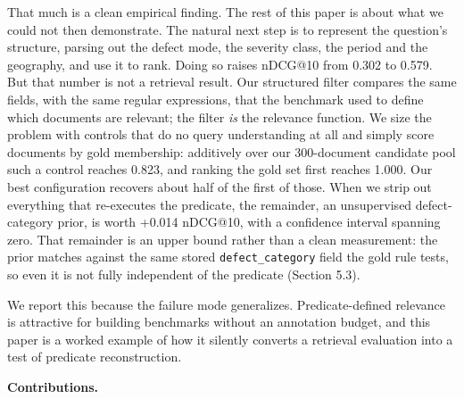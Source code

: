 \documentclass[acmsmall]{acmart}
\begin{document}
That much is a clean empirical finding. The rest of this paper is about what we could not then demonstrate. The natural next step is to represent the question's structure, parsing out the defect mode, the severity class, the period and the geography, and use it to rank. Doing so raises nDCG@10 from 0.302 to 0.579. But that number is not a retrieval result. Our structured filter compares the same fields, with the same regular expressions, that the benchmark used to define which documents are relevant; the filter \textit{is} the relevance function. We size the problem with controls that do no query understanding at all and simply score documents by gold membership: additively over our 300-document candidate pool such a control reaches 0.823, and ranking the gold set first reaches 1.000. Our best configuration recovers about half of the first of those. When we strip out everything that re-executes the predicate, the remainder, an unsupervised defect-category prior, is worth +0.014 nDCG@10, with a confidence interval spanning zero. That remainder is an upper bound rather than a clean measurement: the prior matches against the same stored \texttt{defect\_category} field the gold rule tests, so even it is not fully independent of the predicate (Section 5.3).

We report this because the failure mode generalizes. Predicate-defined relevance is attractive for building benchmarks without an annotation budget, and this paper is a worked example of how it silently converts a retrieval evaluation into a test of predicate reconstruction.

\textbf{Contributions.}
\end{document}
